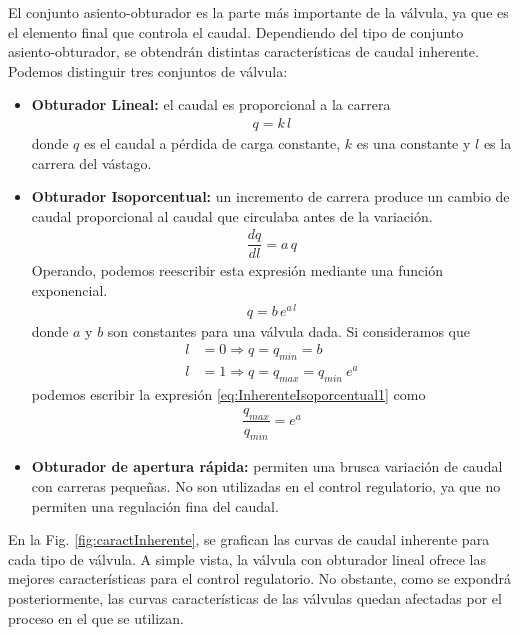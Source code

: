 El conjunto asiento-obturador es la parte más importante de la válvula, ya que
es el elemento final que controla el caudal.
Dependiendo del tipo de conjunto asiento-obturador, se obtendrán distintas
características de caudal inherente.
Podemos distinguir tres conjuntos de válvula:
\begin{itemize}
  \item \textbf{Obturador Lineal:} el caudal es proporcional a la carrera
  \begin{align}
	q = k\,l
	\label{eq:inherenteLineal}
  \end{align}
  donde $q$ es el caudal a pérdida de carga constante, $k$ es una constante y
$l$ es la carrera del vástago.

  \item \textbf{Obturador Isoporcentual:}
  un incremento de carrera produce un cambio de caudal proporcional al caudal
que circulaba antes de la variación.
  \begin{align}
    \dfrac{dq}{dl} = a \, q
  \end{align}
  Operando, podemos reescribir esta expresión mediante una función exponencial.
\begin{align}
 q = b\,e^{a\,l}
 \label{eq:InherenteIsoporcentual1}
\end{align}
  donde $a$ y $b$ son constantes para una válvula dada.
  Si consideramos que
    \begin{align}
        l &= 0 \Rightarrow q = q_{min} = b\\
        l &= 1 \Rightarrow q = q_{max} = q_{min} \:e^a
    \end{align}
    podemos escribir la expresión \eqref{eq:InherenteIsoporcentual1} como
    \begin{align}
      \dfrac{q_{max}}{q_{min}} = e^a
    \end{align}
  \item \textbf{Obturador de apertura rápida:} permiten una brusca variación de
caudal con carreras pequeñas.
  No son utilizadas en el control regulatorio, ya que no permiten una
regulación fina del caudal.
\end{itemize}

En la Fig. \ref{fig:caractInherente}, se grafican las curvas de caudal
inherente para cada tipo de válvula.
A simple vista, la válvula con obturador lineal ofrece las mejores
características para el control regulatorio.
No obstante, como se expondrá posteriormente, las curvas características de las
válvulas quedan afectadas por el proceso en el que se utilizan.

